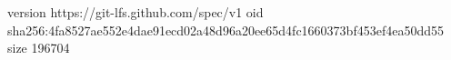 version https://git-lfs.github.com/spec/v1
oid sha256:4fa8527ae552e4dae91ecd02a48d96a20ee65d4fc1660373bf453ef4ea50dd55
size 196704
